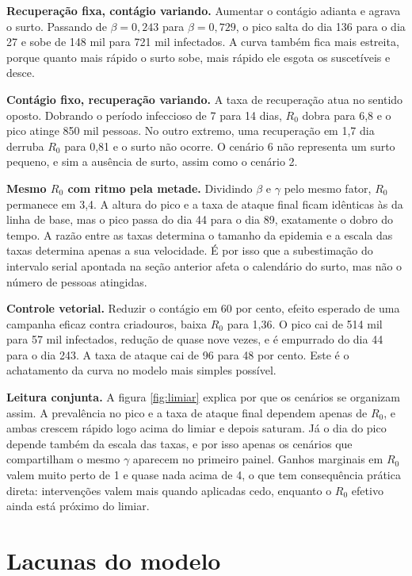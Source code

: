 \documentclass[11pt,a4paper]{article}
\begin{document}
\textbf{Recuperação fixa, contágio variando.} Aumentar o contágio adianta e agrava o surto. Passando de
$\beta = 0{,}243$ para $\beta = 0{,}729$, o pico salta do dia 136 para o dia 27 e sobe de 148 mil para 721
mil infectados. A curva também fica mais estreita, porque quanto mais rápido o surto sobe, mais rápido ele
esgota os suscetíveis e desce.

\textbf{Contágio fixo, recuperação variando.} A taxa de recuperação atua no sentido oposto. Dobrando o
período infeccioso de 7 para 14 dias, $R_0$ dobra para 6,8 e o pico atinge 850 mil pessoas. No outro
extremo, uma recuperação em 1,7 dia derruba $R_0$ para 0,81 e o surto não ocorre. O cenário 6 não
representa um surto pequeno, e sim a ausência de surto, assim como o cenário 2.

\textbf{Mesmo $R_0$ com ritmo pela metade.} Dividindo $\beta$ e $\gamma$ pelo mesmo fator, $R_0$ permanece
em 3,4. A altura do pico e a taxa de ataque final ficam idênticas às da linha de base, mas o pico passa do
dia 44 para o dia 89, exatamente o dobro do tempo. A razão entre as taxas determina o tamanho da epidemia
e a escala das taxas determina apenas a sua velocidade. É por isso que a subestimação do intervalo serial
apontada na seção anterior afeta o calendário do surto, mas não o número de pessoas atingidas.

\textbf{Controle vetorial.} Reduzir o contágio em 60 por cento, efeito esperado de uma campanha eficaz
contra criadouros, baixa $R_0$ para 1,36. O pico cai de 514 mil para 57 mil infectados, redução de quase
nove vezes, e é empurrado do dia 44 para o dia 243. A taxa de ataque cai de 96 para 48 por cento. Este é
o achatamento da curva no modelo mais simples possível.

\textbf{Leitura conjunta.} A figura \ref{fig:limiar} explica por que os cenários se organizam assim. A
prevalência no pico e a taxa de ataque final dependem apenas de $R_0$, e ambas crescem rápido logo acima
do limiar e depois saturam. Já o dia do pico depende também da escala das taxas, e por isso apenas os
cenários que compartilham o mesmo $\gamma$ aparecem no primeiro painel. Ganhos marginais em $R_0$ valem
muito perto de 1 e quase nada acima de 4, o que tem consequência prática direta: intervenções valem mais
quando aplicadas cedo, enquanto o $R_0$ efetivo ainda está próximo do limiar.

\section{Lacunas do modelo}
\label{sec:lacunas}
\end{document}
